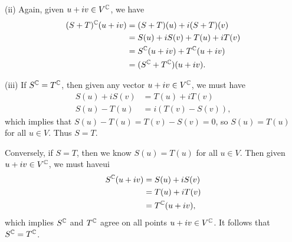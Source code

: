 (ii) Again, given $u + iv \in V^{\mathbb{C}}$, we have
\begin{align*}
    (S + T)^{\mathbb{C}}(u + iv) &= (S + T)(u) + i(S + T)(v) \\
        &= S(u) + iS(v) + T(u) + iT(v) \\
        &= S^{\mathbb{C}}(u + iv) + T^{\mathbb{C}}(u + iv) \\
        &= (S^{\mathbb{C}} + T^{\mathbb{C}})(u + iv).
\end{align*}

(iii) If $S^{\mathbb{C}} = T^{\mathbb{C}}$, then given any vector $u + iv \in V^{\mathbb{C}}$, we must have
\begin{align*}
S(u) + iS(v) &= T(u) + iT(v) \\
S(u) - T(u) &= i(T(v) - S(v)),
\end{align*}
which implies that $S(u) - T(u) = T(v) - S(v) = 0$, so $S(u) = T(u)$ for all $u \in V$. Thus $S = T$.

Conversely, if $S = T$, then we know $S(u) = T(u)$ for all $u \in V$. Then given $u + iv \in V^{\mathbb{C}}$, we must haveui
\begin{align*}
    S^{\mathbb{C}}(u + iv) &= S(u) + iS(v) \\
        &= T(u) + iT(v) \\
        &= T^{\mathbb{C}}(u + iv),
\end{align*}
which implies $S^{\mathbb{C}}$ and $T^{\mathbb{C}}$ agree on all points $u + iv \in V^{\mathbb{C}}$. It follows that $S^{\mathbb{C}} = T^{\mathbb{C}}$.